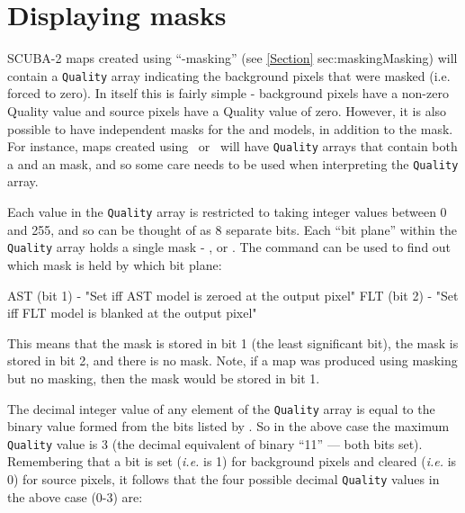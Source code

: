 \section{Displaying masks}
\label{sec:maskshow}

SCUBA-2 maps created using ``-masking'' (see \cref{Section}
{sec:masking}{Masking}) will contain a \texttt{Quality} array indicating the
background pixels that were masked (i.e. forced to zero). In itself this
is fairly simple - background pixels have a non-zero Quality value and
source pixels have a Quality value of zero. However, it is also possible
to have independent masks for the  and  models,
in addition to the  mask. For instance, maps created using
\brightextended\ or \jsageneric\ will have \texttt{Quality} arrays that
contain both a  and an  mask, and so some care needs
to be used when interpreting the \texttt{Quality} array.

Each value in the \texttt{Quality} array is restricted to taking integer values
between 0 and 255, and so can be thought of as 8 separate bits. Each ``bit
plane'' within the \texttt{Quality} array holds a single mask - ,
 or . The 
command can be used to find out which mask is held by which bit plane:

\begin{terminalv}
   AST (bit 1) - "Set iff AST model is zeroed at the output pixel"
   FLT (bit 2) - "Set iff FLT model is blanked at the output pixel"
\end{terminalv}

This means that the  mask is stored in bit 1 (the least significant
bit), the  mask is stored in bit 2, and there is no 
mask. Note, if
a map was produced using  masking but no  masking,
then the  mask would be stored in bit 1.

The decimal integer value of any element of the \texttt{Quality} array is
equal to the binary value formed from the bits listed by .
So in the above case the maximum \texttt{Quality} value is 3 (the decimal
equivalent of binary ``11'' --- both bits set). Remembering that a bit is set
(\emph{i.e.} is 1) for background pixels and cleared (\emph{i.e.} is 0) for
source pixels, it follows that the four possible decimal \texttt{Quality}
values in the above case (0-3) are:

